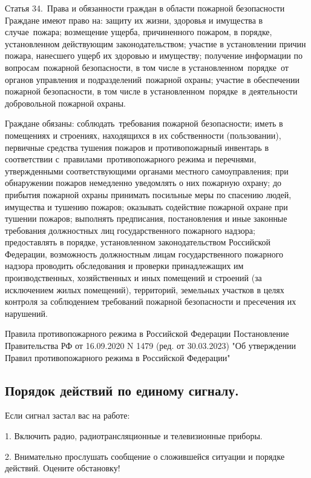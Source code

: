 \documentclass[a4paper, 12pt]{article}
\theoremstyle{definition}
\begin{document}
        Статья 34. Права и обязанности граждан в области пожарной безопасности
        Граждане имеют право на:
        защиту их жизни, здоровья и имущества в случае пожара;
        возмещение ущерба, причиненного пожаром, в порядке, установленном действующим законодательством;
        участие в установлении причин пожара, нанесшего ущерб их здоровью и имуществу;
        получение информации по вопросам пожарной безопасности, в том числе в установленном порядке от органов управления и подразделений пожарной охраны;
        участие в обеспечении пожарной безопасности, в том числе в установленном порядке в деятельности добровольной пожарной охраны.


        Граждане обязаны:
        соблюдать требования пожарной безопасности;
        иметь в помещениях и строениях, находящихся в их собственности (пользовании), первичные средства тушения пожаров и противопожарный инвентарь в соответствии с правилами противопожарного режима и перечнями, утвержденными соответствующими органами местного самоуправления;
        при обнаружении пожаров немедленно уведомлять о них пожарную охрану;
        до прибытия пожарной охраны принимать посильные меры по спасению людей, имущества и тушению пожаров;
        оказывать содействие пожарной охране при тушении пожаров;
        выполнять предписания, постановления и иные законные требования должностных лиц государственного пожарного надзора;
        предоставлять в порядке, установленном законодательством Российской Федерации, возможность должностным лицам государственного пожарного надзора проводить обследования и проверки принадлежащих им производственных, хозяйственных и иных помещений и строений (за исключением жилых помещений), территорий, земельных участков в целях контроля за соблюдением требований пожарной безопасности и пресечения их нарушений.

        Правила противопожарного режима в Российской Федерации
        Постановление Правительства РФ от 16.09.2020 N 1479 (ред. от 30.03.2023) "Об утверждении Правил противопожарного режима в Российской Федерации"	

        \subsection{Порядок действий по единому сигналу.}
        Если сигнал застал вас на работе:

        1. Включить радио, радиотрансляционные и телевизионные приборы.

        2. Внимательно прослушать сообщение о сложившейся ситуации и порядке действий.
        Оцените обстановку!
\end{document}
